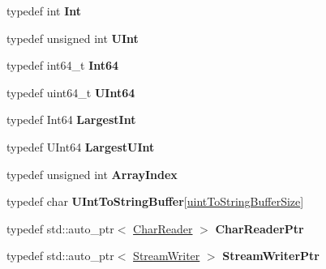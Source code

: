 \begin{DoxyCompactItemize}
\item 
\mbox{\label{namespaceJson_a08122e8005b706d982e48cca1e2119c7}} 
typedef int {\bfseries Int}
\item 
\mbox{\label{namespaceJson_a800fb90eb6ee8d5d62b600c06f87f7d4}} 
typedef unsigned int {\bfseries U\+Int}
\item 
\mbox{\label{namespaceJson_ac62566f36fd33115957b91305c9ed1dc}} 
typedef int64\+\_\+t {\bfseries Int64}
\item 
\mbox{\label{namespaceJson_adf3fa5cb60c619e4f02315ad355e0ca1}} 
typedef uint64\+\_\+t {\bfseries U\+Int64}
\item 
\mbox{\label{namespaceJson_a218d880af853ce786cd985e82571d297}} 
typedef Int64 {\bfseries Largest\+Int}
\item 
\mbox{\label{namespaceJson_ae202ecad69725e23443f465e257456d0}} 
typedef U\+Int64 {\bfseries Largest\+U\+Int}
\item 
\mbox{\label{namespaceJson_a8048e741f2177c3b5d9ede4a5b8c53c2}} 
typedef unsigned int {\bfseries Array\+Index}
\item 
\mbox{\label{namespaceJson_a602bcf69c2042fb61c3b243cb16f04ca}} 
typedef char {\bfseries U\+Int\+To\+String\+Buffer}\mbox{[}\hyperlink{namespaceJson_a2aacab54ef6fc18e833fbd4982a0a23aae4f2008c7919f20d81286121d1374424}{uint\+To\+String\+Buffer\+Size}\mbox{]}
\item 
\mbox{\label{namespaceJson_a4724efb8d41614b47036cb8b54233837}} 
typedef std\+::auto\+\_\+ptr$<$ \hyperlink{classJson_1_1CharReader}{Char\+Reader} $>$ {\bfseries Char\+Reader\+Ptr}
\item 
\mbox{\label{namespaceJson_a7132404aeebfc96d7c6ad2c66260afb5}} 
typedef std\+::auto\+\_\+ptr$<$ \hyperlink{classJson_1_1StreamWriter}{Stream\+Writer} $>$ {\bfseries Stream\+Writer\+Ptr}
\end{DoxyCompactItemize}
